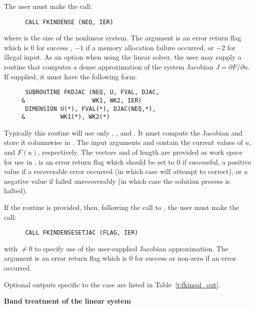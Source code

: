 \begin{Steps}
  The user must make the call:
\begin{verbatim}
      CALL FKINDENSE (NEQ, IER)
\end{verbatim}
  where  is the size of the nonlinear system.
  The argument  is an error return flag which is $0$ 
  for success , $-1$ if a memory allocation failure occurred, or $-2$ for illegal
  input.  
  As an option when using the {\dense} linear solver, the user may supply a
  routine that computes a dense approximation of the system Jacobian 
  $J = \partial F / \partial u$. If supplied, it must have the following form:
\begin{verbatim}
      SUBROUTINE FKDJAC (NEQ, U, FVAL, DJAC,
     &                   WK1, WK2, IER)
      DIMENSION U(*), FVAL(*), DJAC(NEQ,*),
     &          WK1(*), WK2(*)
\end{verbatim}
  Typically this routine will use only , , and . 
  It must compute the Jacobian and store it columnwise in .
  The input arguments  and  contain the current
  values of $u$, and $F(u)$, respectively.
  The vectors  and 
  of length  are provided as work space for use in .
   is an error return flag which should be set to $0$ if successful,
  a positive value if a recoverable error occurred (in which case {\kinsol}
  will attempt to correct), or a negative value if  failed
  unrecoverably (in which case the solution process is halted).

  If the  routine is provided, then, 
  following the call to , the user must make the call:
\begin{verbatim}
      CALL FKINDENSESETJAC (FLAG, IER)
\end{verbatim}
  with  $\neq 0$ to specify use of the user-supplied Jacobian
  approximation.  The argument  is an error return flag which is $0$ 
  for success or non-zero if an error occurred.
  
  Optional outputs specific to the {\dense} case are listed in
  Table~\ref{t:fkinsol_out}.


  {\s} {\bf Band treatment of the linear system}
  

\end{Steps}
